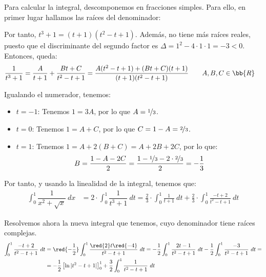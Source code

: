 \begin{ejercicio}
\begin{enumerate}
        Para calcular la integral, descomponemos en fracciones simples. Para ello, en primer lugar hallamos las raíces del denominador:
        \begin{figure}[H]
            \centering
        \end{figure}

        Por tanto, $t^3+1=(t+1)(t^2-t+1)$. Además, no tiene más raíces reales,
        puesto que el discriminante del segundo factor es
        $\Delta = 1^2-4\cdot 1\cdot 1 = -3 < 0$. Entonces, queda:
        \begin{align*}
            \dfrac{1}{t^3 + 1}
            &= \dfrac{A}{t+1} + \dfrac{Bt+C}{t^2-t+1}
            = \dfrac{A(t^2-t+1) + (Bt+C)(t+1)}{(t+1)(t^2-t+1)}
            \qquad A,B,C\in \bb{R}
        \end{align*}

        Igualando el numerador, tenemos:
        \begin{itemize}
            \item \ul{$t=-1$}: Tenemos $1=3A$, por lo que $A=\nicefrac{1}{3}$.
            \item \ul{$t=0$}: Tenemos $1=A+C$, por lo que $C=1-A=\nicefrac{2}{3}$.
            \item \ul{$t=1$}: Tenemos $1=A+2(B+C)=A+2B+2C$, por lo que:
            \begin{equation*}
                B = \frac{1-A-2C}{2} = \frac{1-\nicefrac{1}{3}-2\cdot \nicefrac{2}{3}}{2} = -\frac{1}{3}
            \end{equation*}
        \end{itemize}

        Por tanto, y usando la linealidad de la integral, tenemos que:
        \begin{align*}
            \int_0^1 \dfrac{1}{x^2 + \sqrt{x}}~dx
            &= 2\cdot \int_0^1 \dfrac{1}{t^3 + 1}~dt
            = \frac{2}{3}\cdot \int_0^1 \frac{1}{t+1}~dt
            + \frac{2}{3}\cdot \int_0^1 \frac{-t+2}{t^2-t+1}~dt
        \end{align*}

        Resolvemos ahora la nueva integral que tenemos, cuyo denominador tiene raíces complejas.
        \begin{align*}
            \int_0^1 \dfrac{-t+2}{t^2-t+1}~dt
            &= \red{-\frac{1}{2}} \int_0^1 \dfrac{\red{2}t \red{-4}}{t^2-t+1}~dt
            = -\frac{1}{2}\int_0^1 \dfrac{2t-1}{t^2-t+1}~dt
            -\frac{1}{2}\int_0^1 \dfrac{-3}{t^2-t+1}~dt
            =\\&= -\frac{1}{2}\left[\ln|t^2-t+1|\right]_0^1
            +\frac{3}{2}\int_0^1 \dfrac{1}{t^2-t+1}~dt
        \end{align*}


\end{enumerate}
\end{ejercicio}
